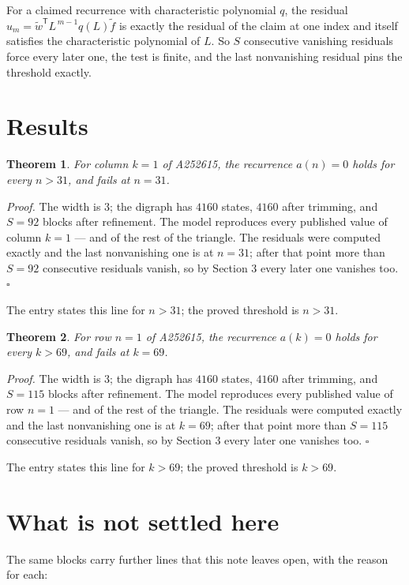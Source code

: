 \documentclass[11pt]{article}
\newtheorem{theorem}{Theorem}
\theoremstyle{definition}
\begin{document}
For a claimed recurrence with characteristic polynomial $q$, the residual $u_m = \tilde w^{\mathsf T}L^{\,m-1}q(L)\tilde f$ is exactly the residual of the claim at one index and itself satisfies the characteristic polynomial of $L$. So $S$ consecutive vanishing residuals force every later one, the test is finite, and the last nonvanishing residual pins the threshold exactly.

\section{Results}

\begin{theorem} For column $k = 1$ of A252615, the recurrence $a(n) = 0$ holds for every $n > 31$, and fails at $n = 31$.\end{theorem}

{\itshape Proof.} The width is $3$; the digraph has $4160$ states, $4160$ after trimming, and $S = 92$ blocks after refinement. The model reproduces every published value of column $k = 1$ --- and of the rest of the triangle. The residuals were computed exactly and the last nonvanishing one is at $n = 31$; after that point more than $S = 92$ consecutive residuals vanish, so by Section 3 every later one vanishes too. $\square$

The entry states this line for $n > 31$; the proved threshold is $n > 31$.

\begin{theorem} For row $n = 1$ of A252615, the recurrence $a(k) = 0$ holds for every $k > 69$, and fails at $k = 69$.\end{theorem}

{\itshape Proof.} The width is $3$; the digraph has $4160$ states, $4160$ after trimming, and $S = 115$ blocks after refinement. The model reproduces every published value of row $n = 1$ --- and of the rest of the triangle. The residuals were computed exactly and the last nonvanishing one is at $k = 69$; after that point more than $S = 115$ consecutive residuals vanish, so by Section 3 every later one vanishes too. $\square$

The entry states this line for $k > 69$; the proved threshold is $k > 69$.

\section{What is not settled here}

The same blocks carry further lines that this note leaves open, with the reason for each:
\end{document}
